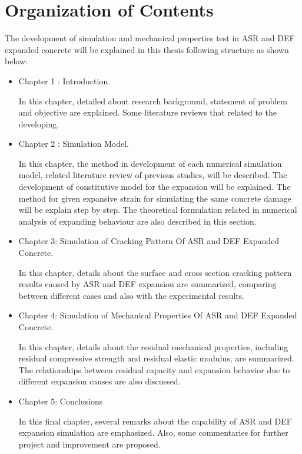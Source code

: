 \section{Organization of Contents}

The development of simulation and mechanical properties test in ASR and DEF expanded concrete will be explained in this thesis following structure as shown below:

\begin{itemize}

    \item Chapter 1 : Introduction.

    In this chapter, detailed about research background, statement of problem and objective are explained. Some literature reviews that related to the developing.

    \item Chapter 2 : Simulation Model.

    In this chapter, the method in development of each numerical simulation model, related literature review of previous studies, will be described. The development of constitutive model for the expansion will be explained. The method for given expansive strain for simulating the same concrete damage will be explain step by step. The theoretical formulation related in numerical analysis of expanding behaviour are also described in this section.

    \item Chapter 3: Simulation of Cracking Pattern Of ASR and DEF Expanded Concrete.

    In this chapter, details about the surface and cross section cracking pattern results caused by ASR and DEF expansion are summarized, comparing between different cases and also with the experimental results.

    \item Chapter 4: Simulation of Mechanical Properties Of ASR and DEF Expanded Concrete.

    In this chapter, details about the residual mechanical properties, including residual compressive strength and residual elastic modulus, are summarized. The relationships between residual capacity and expansion behavior due to different expansion causes are also discussed.

    \item Chapter 5: Conclusions

    In this final chapter, several remarks about the capability of ASR and DEF expansion simulation are emphasized. Also, some commentaries for further project and improvement are proposed.


\end{itemize}
